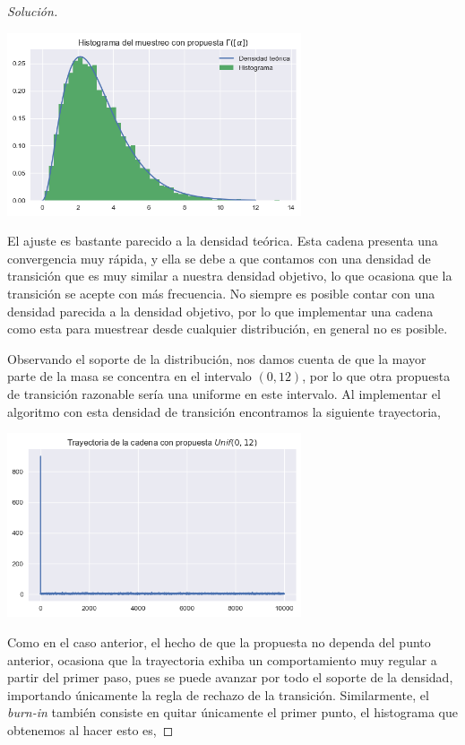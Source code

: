 \documentclass{article}
\begin{document}
\begin{enumerate}
\begin{proof}[Solución]
        \begin{center}
            \includegraphics[width=0.65\textwidth]{tarea7/histgamex2.png}
        \end{center}
        
        El ajuste es bastante parecido a la densidad teórica. Esta cadena presenta una convergencia 
        muy rápida, y ella se debe a que contamos con una densidad de transición que es muy similar
        a nuestra densidad objetivo, lo que ocasiona que la transición se acepte con más frecuencia. 
        No siempre es posible contar con una densidad parecida a la densidad objetivo, por lo que 
        implementar una cadena como esta para muestrear desde cualquier distribución, en general
        no es posible.

        Observando el soporte de la distribución, nos damos cuenta de que la mayor parte de la masa se 
        concentra en el intervalo $(0,12)$, por lo que otra propuesta de transición razonable sería
        una uniforme en este intervalo. Al implementar el algoritmo con esta densidad de transición
        encontramos la siguiente trayectoria,

        \begin{center}
            \includegraphics[width=0.65\textwidth]{tarea7/trajunifex2.png}
        \end{center}

        Como en el caso anterior, el hecho de que la propuesta no dependa del punto anterior, ocasiona
        que la trayectoria exhiba un comportamiento muy regular a partir del primer paso, pues se puede
        avanzar por todo el soporte de la densidad, importando únicamente la regla de rechazo de la
        transición. Similarmente, el \textit{burn-in} también consiste en quitar únicamente el
        primer punto, el histograma que obtenemos al hacer esto es,


\end{proof}
\end{enumerate}
\end{document}
